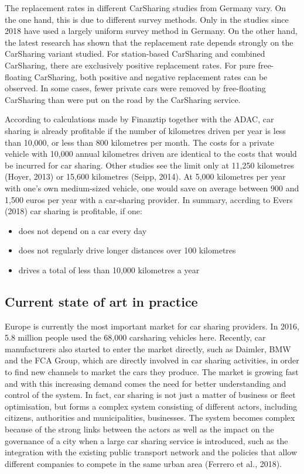 \documentclass[
]{book}
\providecommand{\tightlist}{%
  \setlength{\itemsep}{0pt}\setlength{\parskip}{0pt}}
\begin{document}
The replacement rates in different CarSharing studies from Germany vary. On the one hand, this is due to different survey methods. Only in the studies since 2018 have used a largely uniform survey method in Germany. On the other hand, the latest research has shown that the replacement rate depends strongly on the CarSharing variant studied. For station-based CarSharing and combined CarSharing, there are exclusively positive replacement rates. For pure free-floating CarSharing, both positive and negative replacement rates can be observed. In some cases, fewer private cars were removed by free-floating CarSharing than were put on the road by the CarSharing service.

According to calculations made by Finanztip together with the ADAC, car sharing is already profitable if the number of kilometres driven per year is less than 10,000, or less than 800 kilometres per month. The costs for a private vehicle with 10,000 annual kilometres driven are identical to the costs that would be incurred for car sharing. Other studies see the limit only at 11,250 kilometres (Hoyer, 2013) or 15,600 kilometres (Seipp, 2014). At 5,000 kilometres per year with one's own medium-sized vehicle, one would save on average between 900 and 1,500 euros per year with a car-sharing provider.
In summary, accrding to Evers (2018) car sharing is profitable, if one:

\begin{itemize}
\tightlist
\item
  does not depend on a car every day
\item
  does not regularly drive longer distances over 100 kilometres
\item
  drives a total of less than 10,000 kilometres a year
\end{itemize}

\hypertarget{current-state-of-art-in-practice-30}{%
\subsection*{Current state of art in practice}\label{current-state-of-art-in-practice-30}}

Europe is currently the most important market for car sharing providers. In 2016, 5.8 million people used the 68,000 carsharing vehicles here. Recently, car manufacturers also started to enter the market directly, such as Daimler, BMW and the FCA Group, which are directly involved in car sharing activities, in order to find new channels to market the cars they produce. The market is growing fast and with this increasing demand comes the need for better understanding and control of the system. In fact, car sharing is not just a matter of business or fleet optimisation, but forms a complex system consisting of different actors, including citizens, authorities and municipalities, businesses. The system becomes complex because of the strong links between the actors as well as the impact on the governance of a city when a large car sharing service is introduced, such as the integration with the existing public transport network and the policies that allow different companies to compete in the same urban area (Ferrero et al., 2018).
\end{document}
